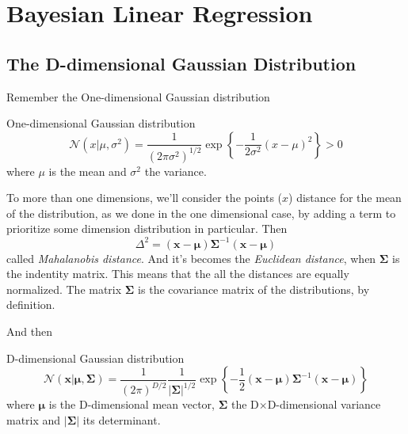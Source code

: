 \section{Bayesian Linear Regression}
\framecard{\insertsection}

\subsection{The D-dimensional Gaussian Distribution}

\begin{frame}{\insertsubsection}

Remember the One-dimensional Gaussian distribution
\begin{block}{One-dimensional Gaussian distribution}
\begin{equation*}
	\mathcal{N}(x | \mu, \sigma^2) = \frac{1}{(2 \pi \sigma^2)^{1/2}} \exp \left\{ -\frac{1}{2 \sigma^2} (x- \mu)^2 \right\} > 0
\end{equation*}
where $\mu$ is the mean and $\sigma^2$ the variance.
\end{block}
\end{frame}

\begin{frame}{\insertsubsection}
	To more than one dimensions, we'll consider the points ($x$) distance for the mean of the distribution, as we done in the one dimensional case, by adding a term to prioritize some dimension distribution in particular. Then
	\begin{equation*}
		\Delta^2 = (\mathbf{x} - \boldsymbol{\mu}) \boldsymbol{\Sigma} ^{-1} (\mathbf{x} - \boldsymbol{\mu}) 
	\end{equation*}
called \textit{Mahalanobis distance}. And it's becomes the \textit{Euclidean distance}, when $\boldsymbol{\Sigma}$ is the indentity matrix. This means that the all the distances are equally normalized. The matrix $\boldsymbol{\Sigma}$ is the covariance matrix of the distributions, by definition.
\end{frame}

\begin{frame}{\insertsubsection}
And then
\begin{block}{D-dimensional Gaussian distribution}
\begin{equation*}
	\mathcal{N}(\mathbf{x} | \boldsymbol{\mu}, \boldsymbol{\Sigma}) = \frac{1}{(2 \pi )^{D/2}} \frac{1}{|\boldsymbol{\Sigma}|^{1/2}} \exp \left\{ -\frac{1}{2} (\mathbf{x} - \boldsymbol{\mu}) \boldsymbol{\Sigma} ^{-1} (\mathbf{x} - \boldsymbol{\mu})  \right\} 
\end{equation*}
where $\boldsymbol{\mu}$ is the D-dimensional mean vector, $\boldsymbol{\Sigma}$ the D$\times$D-dimensional variance matrix and $|\boldsymbol{\Sigma}|$ its determinant.
\end{block}
\end{frame}

